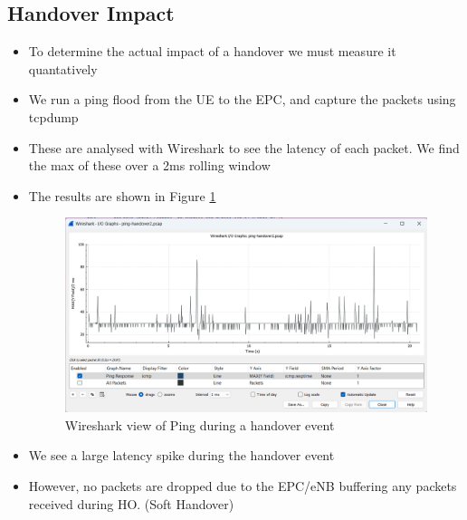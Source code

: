 \subsection{Handover Impact}
\begin{itemize}
    \item To determine the actual impact of a handover we must measure it quantatively
    \item We run a ping flood from the UE to the EPC, and capture the packets using tcpdump
    \item These are analysed with Wireshark to see the latency of each packet. We find the max of  these over a 2ms rolling window 
    \item The results are shown in Figure \ref{fig:methods:ping-handover}
\begin{figure}
    \centering
    \includegraphics[width=0.75\linewidth]{src//img/ping-handover.png}
    \caption{Wireshark view of Ping during a handover event}
    \label{fig:methods:ping-handover}
\end{figure}

\item We see a large latency spike during the handover event
\item However, no packets are dropped due to the EPC/eNB buffering any packets received during HO. (Soft Handover)
\end{itemize}
